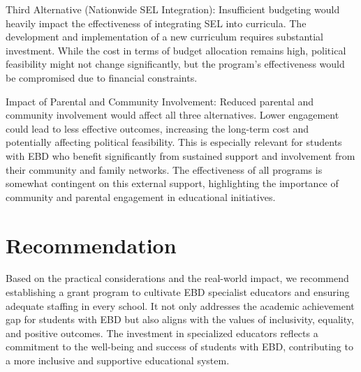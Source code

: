 \documentclass[11pt]{article}
\begin{document}
Third Alternative (Nationwide SEL Integration): Insufficient budgeting would heavily impact the effectiveness of integrating SEL into curricula. The development and implementation of a new curriculum requires substantial investment. While the cost in terms of budget allocation remains high, political feasibility might not change significantly, but the program's effectiveness would be compromised due to financial constraints.

Impact of Parental and Community Involvement: Reduced parental and community involvement would affect all three alternatives. Lower engagement could lead to less effective outcomes, increasing the long-term cost and potentially affecting political feasibility. This is especially relevant for students with EBD who benefit significantly from sustained support and involvement from their community and family networks. The effectiveness of all programs is somewhat contingent on this external support, highlighting the importance of community and parental engagement in educational initiatives.

\section{Recommendation}

Based on the practical considerations and the real-world impact, we recommend establishing a grant program to cultivate EBD specialist educators and ensuring adequate staffing in every school. It not only addresses the academic achievement gap for students with EBD but also aligns with the values of inclusivity, equality, and positive outcomes. The investment in specialized educators reflects a commitment to the well-being and success of students with EBD, contributing to a more inclusive and supportive educational system.
\end{document}
